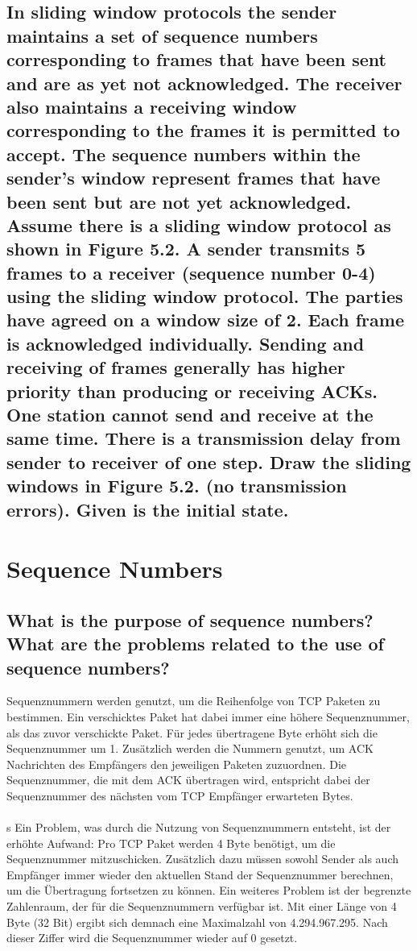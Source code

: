 \documentclass[a4paper,
			llpt,
			solution,
			accentcolor=tud2d,
			colorbacktitle
			]
			{tudexercise}
\begin{document}
\subsection{In sliding window protocols the sender maintains a set of sequence numbers corresponding to frames that have been sent and are as yet not acknowledged. The receiver also maintains a receiving window corresponding to the frames it is permitted to accept. The sequence numbers within the sender’s window represent frames that have been sent but are not yet acknowledged. Assume there is a sliding window protocol as shown in Figure 5.2. A sender transmits 5 frames to a receiver (sequence number 0-4) using the sliding window protocol. The parties have agreed on a window size of 2. Each frame is acknowledged individually. Sending and receiving of frames generally has higher priority than producing or receiving ACKs. One station cannot send and receive at the same time. There is a transmission delay from sender to receiver of one step. Draw the sliding windows in Figure 5.2. (no transmission errors). Given is the initial state.}
\section{Sequence Numbers}
\subsection{What is the purpose of sequence numbers? What are the problems related to the use of sequence numbers?}
Sequenznummern werden genutzt, um die Reihenfolge von TCP Paketen zu bestimmen.  Ein verschicktes Paket hat dabei immer eine höhere Sequenznummer, als das zuvor verschickte Paket.
Für jedes übertragene Byte erhöht sich die Sequenznummer um 1.
Zusätzlich werden die Nummern genutzt, um ACK Nachrichten des Empfängers den jeweiligen Paketen zuzuordnen. Die Sequenznummer, die mit dem ACK übertragen wird, entspricht dabei der Sequenznummer des nächsten vom TCP Empfänger erwarteten Bytes.
\\\\s
Ein Problem, was durch die Nutzung von Sequenznummern entsteht, ist der erhöhte Aufwand: Pro TCP Paket werden 4 Byte benötigt, um die Sequenznummer mitzuschicken. Zusätzlich dazu müssen sowohl Sender als auch Empfänger immer wieder den aktuellen Stand der Sequenznummer berechnen, um die Übertragung fortsetzen zu können.
Ein weiteres Problem ist der begrenzte Zahlenraum, der für die Sequenznummern verfügbar ist. Mit einer Länge von 4 Byte (32 Bit) ergibt sich demnach eine Maximalzahl von 4.294.967.295. Nach dieser Ziffer wird die Sequenznummer wieder auf 0 gesetzt.
\end{document}
